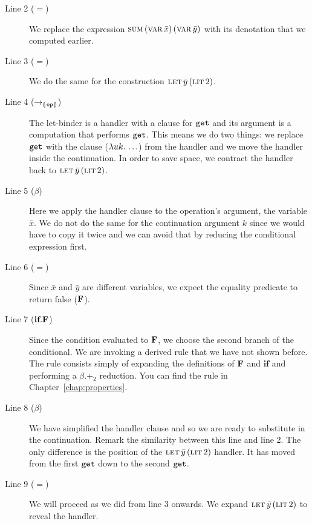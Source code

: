 \begin{description}

  \item[Line 2 ($=$)] We replace the expression
    $\textsc{sum}\,(\textsc{var}\,\bar{x})\,(\textsc{var}\,\bar{y})$ with its denotation that we computed
    earlier.

  \item[Line 3 ($=$)] We do the same for the construction
    $\textsc{let}\,\bar{y}\,(\textsc{lit}\,2)$.

  \item[Line 4 ($\to_{\llparenthesis \, \mathtt{op} \, \rrparenthesis}$)] The let-binder is a handler with
    a clause for $\mathtt{get}$ and its argument is a computation that performs
    $\mathtt{get}$. This means we do two things: we replace $\mathtt{get}$ with the
    clause ($\lambda u k.\, \ldots$) from the handler and we move the handler
    inside the continuation. In order to save space, we contract the
    handler back to $\textsc{let}\,\bar{y}\,(\textsc{lit}\,2)$.

  \item[Line 5 ($\beta$)] Here we apply the handler clause to the
    operation's argument, the variable $\bar{x}$. We do not do the same for
    the continuation argument $k$ since we would have to copy it twice and
    we can avoid that by reducing the conditional expression first.

  \item[Line 6 ($=$)] Since $\bar{x}$ and $\bar{y}$ are different
    variables, we expect the equality predicate to return false ($\textbf{F}$).

  \item[Line 7 ($\textbf{if}.\textbf{F}$)] Since the condition evaluated to
    $\textbf{F}$, we choose the second branch of the conditional. We are
    invoking a derived rule that we have not shown before. The rule
    consists simply of expanding the definitions of $\textbf{F}$ and
    $\textbf{if}$ and performing a $\beta.+_2$ reduction. You can find the
    rule in Chapter~\ref{chap:properties}.

  \item[Line 8 ($\beta$)] We have simplified the handler clause and so
    we are ready to substitute in the continuation. Remark the similarity
    between this line and line 2. The only difference is the position of
    the $\textsc{let}\,\bar{y}\,(\textsc{lit}\,2)$ handler. It has moved from the
    first $\mathtt{get}$ down to the second $\mathtt{get}$.

  \item[Line 9 ($=$)] We will proceed as we did from line 3 onwards. We
    expand $\textsc{let}\,\bar{y}\,(\textsc{lit}\,2)$ to reveal the handler.


\end{description}

